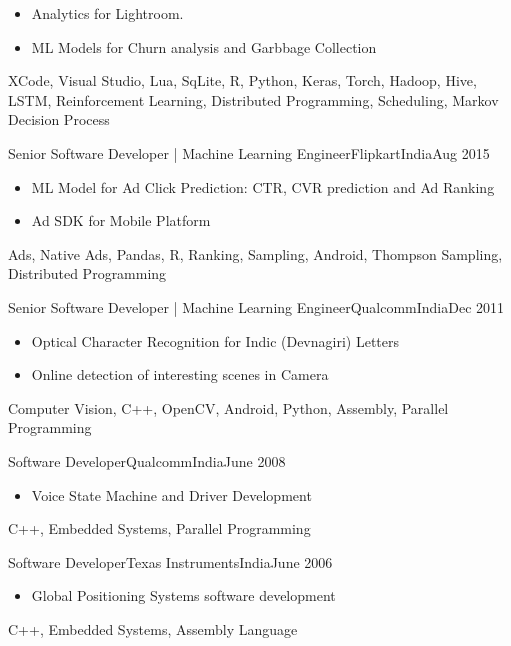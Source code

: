 \begin{experiences}
{\begin{itemize}
  	\item Analytics for Lightroom.
  	
  	\item ML Models for Churn analysis and Garbbage Collection
  \end{itemize}
	}
  {XCode, Visual Studio, Lua, SqLite, R, Python, Keras, Torch, Hadoop, Hive, LSTM, Reinforcement Learning, Distributed Programming, Scheduling, Markov Decision Process}
  \emptySeparator
  
   {Senior Software Developer | Machine Learning Engineer}{Flipkart}{India}{Aug 2015}    
  {
  	\begin{itemize}
  		
  		\item ML Model for Ad Click Prediction: CTR, CVR prediction and Ad Ranking
  		
  		\item Ad SDK for Mobile Platform
  	\end{itemize}
  }
{ Ads, Native Ads, Pandas, R, Ranking, Sampling, Android, Thompson Sampling, Distributed Programming}
\emptySeparator

   {Senior Software Developer | Machine Learning Engineer}{Qualcomm}{India}{Dec 2011}    
  {
	\begin{itemize}
		\item Optical Character Recognition for Indic (Devnagiri) Letters
		\item Online detection of interesting scenes in Camera
	\end{itemize}
  }
  { Computer Vision, C++, OpenCV, Android, Python, Assembly, Parallel Programming}
  
  \emptySeparator
 
   {Software Developer}{Qualcomm}{India}{June 2008}    
	{
		\begin{itemize}
			\item Voice State Machine and Driver Development
		\end{itemize}
	}
	{ C++, Embedded Systems, Parallel Programming}

  \emptySeparator  
   {Software Developer}{Texas Instruments}{India}{June 2006}    
	{
		\begin{itemize}
			\item Global Positioning Systems software development
		\end{itemize}
	}
	{ C++, Embedded Systems, Assembly Language}  	
	  
\emptySeparator
  
\end{experiences}

